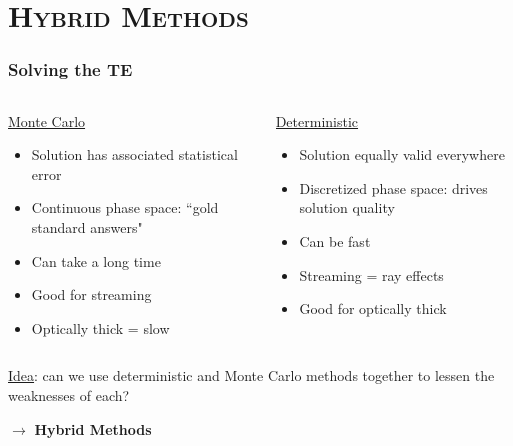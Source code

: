 \documentclass[xcolor=x11names,compress]{beamer}
\renewcommand{\(}{\begin{columns}}
\renewcommand{\)}{\end{columns}}
\newcommand{\<}[1]{\begin{column}{#1}}
\renewcommand{\>}{\end{column}}
\begin{document}
\section{\scshape Hybrid Methods}
\begin{frame}[fragile]
  \frametitle{Solving the TE}

\begin{columns}
  \begin{column}{0.5\textwidth}
  \begin{center}
  \underline{Monte Carlo}
  \end{center}
	\begin{itemize}
	\item Solution has associated statistical error
	\item Continuous phase space: ``gold standard answers"
	\item Can take a long time
	\item Good for streaming
	\item Optically thick = slow
	\end{itemize}
  \end{column}
  \begin{column}{0.5\textwidth}
  \begin{center}
  \underline{Deterministic}
  \end{center}
	\begin{itemize}
	\item Solution equally valid everywhere
	\item Discretized phase space: drives solution quality
	\item Can be fast
	\item Streaming = ray effects
	\item Good for optically thick
	\end{itemize}
  \end{column}
\end{columns}

\vspace*{1em}
\underline{Idea}: can we use deterministic and Monte Carlo methods together to lessen the weaknesses of each?

\vspace*{1em}
  $\rightarrow$ \textbf{Hybrid Methods}

\end{frame}
\end{document}
